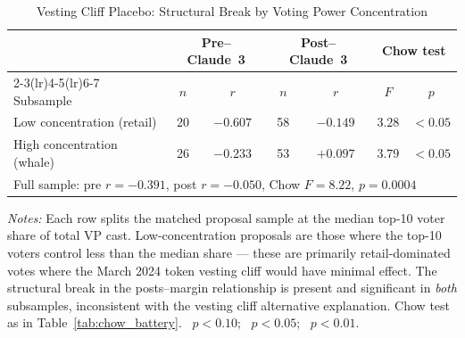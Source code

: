 \begin{table}[htbp]
\centering
\caption{Vesting Cliff Placebo: Structural Break by Voting Power Concentration}
\label{tab:concentration_control}
\begin{tabular}{lcccccc}
\toprule
 & \multicolumn{2}{c}{Pre--Claude~3} & \multicolumn{2}{c}{Post--Claude~3} & \multicolumn{2}{c}{Chow test} \\
\cmidrule(lr){2-3}\cmidrule(lr){4-5}\cmidrule(lr){6-7}
Subsample & $n$ & $r$ & $n$ & $r$ & $F$ & $p$ \\
\midrule
  Low concentration (retail) & 20 & $-0.607$ & 58 & $-0.149$ & $3.28$ & $<0.05$\sym{**} \\
  High concentration (whale) & 26 & $-0.233$ & 53 & $+0.097$ & $3.79$ & $<0.05$\sym{**} \\
\midrule
\multicolumn{7}{l}{Full sample: pre $r=-0.391$, post $r=-0.050$, Chow $F=8.22$, $p=0.0004$} \\
\bottomrule
\end{tabular}
\begin{flushleft}
\small\textit{Notes:} Each row splits the matched proposal sample at the median
top-10 voter share of total VP cast. Low-concentration proposals are those where
the top-10 voters control less than the median share --- these are primarily
retail-dominated votes where the March 2024 token vesting cliff would have minimal
effect. The structural break in the posts--margin relationship is present and
significant in \emph{both} subsamples, inconsistent with the vesting cliff
alternative explanation. Chow test as in Table~\ref{tab:chow_battery}.
\sym{*}~$p < 0.10$; \sym{**}~$p < 0.05$; \sym{***}~$p < 0.01$.
\end{flushleft}
\end{table}
